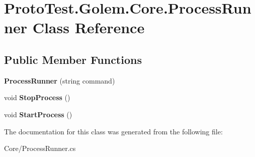 \hypertarget{class_proto_test_1_1_golem_1_1_core_1_1_process_runner}{\section{Proto\-Test.\-Golem.\-Core.\-Process\-Runner Class Reference}
\label{class_proto_test_1_1_golem_1_1_core_1_1_process_runner}
}
\subsection*{Public Member Functions}
\begin{DoxyCompactItemize}
\item 
\hypertarget{class_proto_test_1_1_golem_1_1_core_1_1_process_runner_ab74a29b3975e635d51c567f171c2b1e9}{{\bfseries Process\-Runner} (string command)}\label{class_proto_test_1_1_golem_1_1_core_1_1_process_runner_ab74a29b3975e635d51c567f171c2b1e9}

\item 
\hypertarget{class_proto_test_1_1_golem_1_1_core_1_1_process_runner_ada7bcc4e02c28071a9bbb0504c11570e}{void {\bfseries Stop\-Process} ()}\label{class_proto_test_1_1_golem_1_1_core_1_1_process_runner_ada7bcc4e02c28071a9bbb0504c11570e}

\item 
\hypertarget{class_proto_test_1_1_golem_1_1_core_1_1_process_runner_ade86af9e4875c1084ff64d9a7b6331ac}{void {\bfseries Start\-Process} ()}\label{class_proto_test_1_1_golem_1_1_core_1_1_process_runner_ade86af9e4875c1084ff64d9a7b6331ac}

\end{DoxyCompactItemize}


The documentation for this class was generated from the following file\-:\begin{DoxyCompactItemize}
\item 
Core/Process\-Runner.\-cs\end{DoxyCompactItemize}
